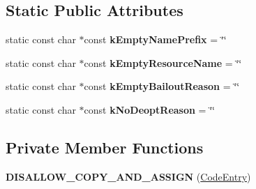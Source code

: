 \subsection*{Static Public Attributes}
\begin{DoxyCompactItemize}
\item 
static const char $\ast$const {\bfseries k\+Empty\+Name\+Prefix} = \char`\"{}\char`\"{}\hypertarget{classv8_1_1internal_1_1_code_entry_ab7782a3e7e086bb6aef3262f85382bf0}{}\label{classv8_1_1internal_1_1_code_entry_ab7782a3e7e086bb6aef3262f85382bf0}

\item 
static const char $\ast$const {\bfseries k\+Empty\+Resource\+Name} = \char`\"{}\char`\"{}\hypertarget{classv8_1_1internal_1_1_code_entry_a8252e4f992350bf1a093c275694332cb}{}\label{classv8_1_1internal_1_1_code_entry_a8252e4f992350bf1a093c275694332cb}

\item 
static const char $\ast$const {\bfseries k\+Empty\+Bailout\+Reason} = \char`\"{}\char`\"{}\hypertarget{classv8_1_1internal_1_1_code_entry_ab3288c79f50d86af34c09214795aa2f2}{}\label{classv8_1_1internal_1_1_code_entry_ab3288c79f50d86af34c09214795aa2f2}

\item 
static const char $\ast$const {\bfseries k\+No\+Deopt\+Reason} = \char`\"{}\char`\"{}\hypertarget{classv8_1_1internal_1_1_code_entry_a043c3c8bbfd302e3b09b8e51d44e144b}{}\label{classv8_1_1internal_1_1_code_entry_a043c3c8bbfd302e3b09b8e51d44e144b}

\end{DoxyCompactItemize}
\subsection*{Private Member Functions}
\begin{DoxyCompactItemize}
\item 
{\bfseries D\+I\+S\+A\+L\+L\+O\+W\+\_\+\+C\+O\+P\+Y\+\_\+\+A\+N\+D\+\_\+\+A\+S\+S\+I\+GN} (\hyperlink{classv8_1_1internal_1_1_code_entry}{Code\+Entry})\hypertarget{classv8_1_1internal_1_1_code_entry_ae5505e02e0a55b95658e6484481cf308}{}\label{classv8_1_1internal_1_1_code_entry_ae5505e02e0a55b95658e6484481cf308}

\end{DoxyCompactItemize}
